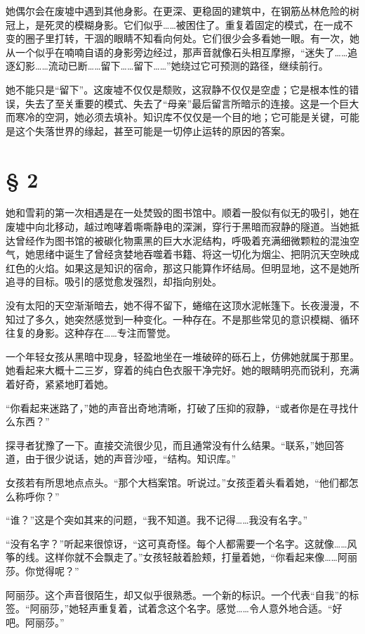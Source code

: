 她偶尔会在废墟中遇到其他身影。在更深、更稳固的建筑中，在钢筋丛林危险的树冠上，是死灵的模糊身影。它们似乎……被困住了。重复着固定的模式，在一成不变的圈子里打转，干涸的眼睛不知看向何处。它们很少会多看她一眼。有一次，她从一个似乎在喃喃自语的身影旁边经过，那声音就像石头相互摩擦，“迷失了……追逐幻影……流动已断……留下……留下……”她绕过它可预测的路径，继续前行。

她不能只是“留下”。这废墟不仅仅是颓败，这寂静不仅仅是空虚；它是根本性的错误，失去了至关重要的模式、失去了“母亲”最后留言所暗示的连接。这是一个巨大而寒冷的空洞，她必须去填补。知识库不仅仅是一个目的地；它可能是关键，可能是这个失落世界的缘起，甚至可能是一切停止运转的原因的答案。

\section{§ 2}

她和雪莉的第一次相遇是在一处焚毁的图书馆中。顺着一股似有似无的吸引，她在废墟中向北移动，越过咆哮着嘶嘶静电的深渊，穿行于黑暗而寂静的隧道。当她抵达曾经作为图书馆的被碳化物熏黑的巨大水泥结构，呼吸着充满细微颗粒的混浊空气，她思绪中诞生了曾经贪婪地吞噬着书籍、将这一切化为烟尘、把阴沉天空映成红色的火焰。如果这是知识的宿命，那这只能算作坏结局。但明显地，这不是她所追寻的目标。吸引的感觉愈发强烈，却指向别处。

没有太阳的天空渐渐暗去，她不得不留下，蜷缩在这顶水泥帐篷下。长夜漫漫，不知过了多久，她突然感觉到一种变化。一种存在。不是那些常见的意识模糊、循环往复的身影。这种存在……专注而警觉。

一个年轻女孩从黑暗中现身，轻盈地坐在一堆破碎的砾石上，仿佛她就属于那里。她看起来大概十二三岁，穿着的纯白色衣服干净完好。她的眼睛明亮而锐利，充满着好奇，紧紧地盯着她。

“你看起来迷路了，”她的声音出奇地清晰，打破了压抑的寂静，“或者你是在寻找什么东西？”

探寻者犹豫了一下。直接交流很少见，而且通常没有什么结果。“联系，”她回答道，由于很少说话，她的声音沙哑，“结构。知识库。”

女孩若有所思地点点头。“那个大档案馆。听说过。”女孩歪着头看着她，“他们都怎么称呼你？”

“谁？”这是个突如其来的问题，“我不知道。我不记得……我没有名字。”

“没有名字？”听起来很惊讶，“这可真奇怪。每个人都需要一个名字。这就像……风筝的线。这样你就不会飘走了。”女孩轻敲着脸颊，打量着她，“你看起来像……阿丽莎。你觉得呢？”

阿丽莎。这个声音很陌生，却又似乎很熟悉。一个新的标识。一个代表“自我”的标签。“阿丽莎，”她轻声重复着，试着念这个名字。感觉……令人意外地合适。“好吧。阿丽莎。”


